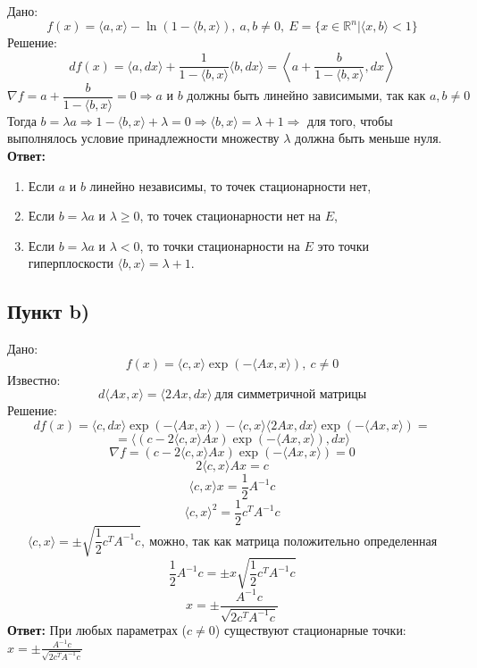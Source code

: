 \documentclass[a4paper,12pt]{article}
\begin{document}
Дано:
    \[f(x) = \langle a, x \rangle - \ln (1 - \langle b, x \rangle),\ a, b \not = 0,\ E = \{x \in \mathbb{R}^n | \langle x, b \rangle < 1 \}\]
Решение:
    \[df(x) = \langle a, dx \rangle + \frac{1}{1 - \langle b, x \rangle} \langle b, dx \rangle = \left\langle a + \frac{b}{1 - \langle b, x \rangle}, dx \right\rangle\]
    \[\nabla f = a + \frac{b}{1 - \langle b, x \rangle} = 0 \Rightarrow a \text{ и } b \text{ должны быть линейно зависимыми, так как } a, b \not = 0\]
Тогда $b = \lambda a \Rightarrow 1 - \langle b, x \rangle + \lambda = 0 \Rightarrow \langle b, x \rangle = \lambda + 1 \Rightarrow$ для того, чтобы выполнялось условие принадлежности множеству $\lambda$ должна быть меньше нуля.\\
\textbf{Ответ:}
\begin{enumerate}
    \item Если $a$ и $b$ линейно независимы, то точек стационарности нет,
    \item Если $b = \lambda a$ и $\lambda \geq 0$, то точек стационарности нет на $E$,
    \item Если $b = \lambda a$ и $\lambda < 0$, то точки стационарности на $E$ это точки гиперплоскости $\langle b, x \rangle = \lambda + 1$.
\end{enumerate}

\subsection{Пункт b)}

Дано:
    \[f(x) = \langle c, x \rangle \exp{(-\langle Ax, x \rangle)},\ c \not = 0\]
Известно:
    \[d\langle Ax, x \rangle = \langle 2Ax, dx \rangle\ \text{для симметричной матрицы}\]
Решение:
    \[df(x) = \langle c, dx \rangle \exp{(-\langle Ax, x \rangle)} - \langle c, x \rangle \langle 2Ax, dx \rangle \exp{(-\langle Ax, x \rangle)} = \]
    \[= \langle (c - 2\langle c, x \rangle Ax) \exp{(-\langle Ax, x \rangle)}, dx \rangle\]
    \[\nabla f = (c - 2\langle c, x \rangle Ax) \exp{(-\langle Ax, x \rangle)} = 0\]
    \[2\langle c, x \rangle Ax = c\]
    \[\langle c, x \rangle x = \frac{1}{2}A^{-1}c\]
    \[\langle c, x \rangle^2 = \frac{1}{2}c^TA^{-1}c\]
    \[\langle c, x \rangle = \pm \sqrt{\frac{1}{2}c^TA^{-1}c},\ \text{можно, так как матрица положительно определенная}\]
    \[\frac{1}{2}A^{-1}c = \pm x \sqrt{\frac{1}{2}c^TA^{-1}c}\]
    \[x = \pm \frac{A^{-1}c}{\sqrt{2c^TA^{-1}c}}\]
\textbf{Ответ:}
    При любых параметрах ($c \not = 0$) существуют стационарные точки: $x = \pm \frac{A^{-1}c}{\sqrt{2c^TA^{-1}c}}$
    
\end{document}

